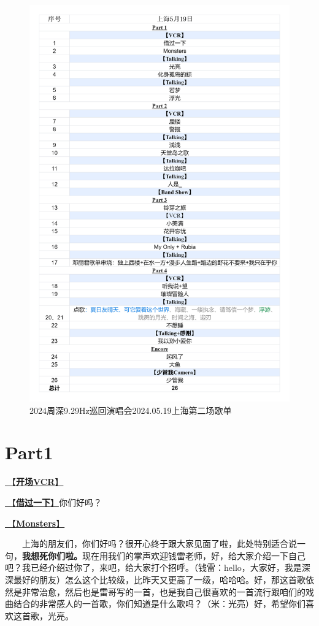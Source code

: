 \documentclass[]{ctexbook}
\begin{document}
\begin{figure}

{\centering \includegraphics[width=320pt]{img/playlists/playlists-shanghai-20240519} 

}

\caption{2024周深9.29Hz巡回演唱会2024.05.19上海第二场歌单}\label{fig:unnamed-chunk-40}
\end{figure}

\newpage

\section{Part1}\label{shanghai-20240519-part1}

\hyperref[opening-vcr]{🎥【\textbf{开场VCR}】}

\hyperref[I-will-go-my-way]{🎵【\textbf{借过一下}】}你们好吗？

\hyperref[Monsters]{🎵【\textbf{Monsters}】}

  上海的朋友们，你们好吗？很开心终于跟大家见面了啦，此处特别适合说一句，\textbf{我想死你们啦。}现在用我们的掌声欢迎钱雷老师，好，给大家介绍一下自己吧？我已经介绍过你了，来吧，给大家打个招呼。（钱雷：hello，大家好，我是深深最好的朋友）怎么这个比较级，比昨天又更高了一级，哈哈哈。好，那这首歌依然是非常治愈，然后也是雷哥写的一首，也是我自己很喜欢的一首流行跟咱们的戏曲结合的非常感人的一首歌，你们知道是什么歌吗？（米：光亮）好，希望你们喜欢这首歌，光亮。
\end{document}
